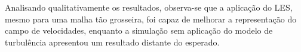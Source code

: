 Analisando qualitativamente os resultados, observa-se que a aplicação do LES, mesmo para uma malha tão grosseira, foi capaz de melhorar a representação do campo de velocidades, enquanto a simulação sem aplicação do modelo de turbulência apresentou um resultado distante do esperado.


